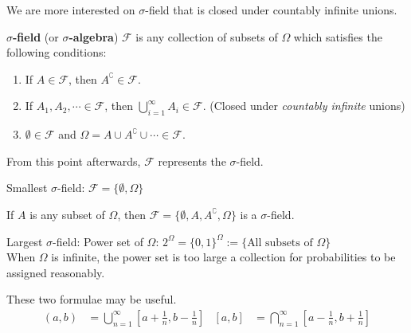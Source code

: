 \documentclass{huhtakm-template-book}
\begin{document}
    \newpage
    We are more interested on $\sigma$-field that is closed under countably infinite unions.
    \begin{defn} %
        \textbf{$\sigma$-field} (or \textbf{$\sigma$-algebra}) $\mathcal{F}$ is any collection of subsets of $\Omega$ which satisfies the following conditions:
        \begin{enumerate}
            \item If $A\in\mathcal{F}$, then $A^{\complement}\in\mathcal{F}$.
            \item If $A_{1},A_{2},\cdots\in\mathcal{F}$, then $\bigcup_{i=1}^{\infty}A_{i}\in\mathcal{F}$. (Closed under \textit{countably infinite} unions)
            \item $\emptyset\in\mathcal{F}$ and $\Omega=A\cup A^{\complement}\cup\cdots\in\mathcal{F}$.
        \end{enumerate}
    \end{defn}
    \begin{rem}
    	From this point afterwards, $\mathcal{F}$ represents the $\sigma$-field.
    \end{rem}
    \begin{eg}
        Smallest $\sigma$-field: $\mathcal{F}=\{\emptyset,\Omega\}$
    \end{eg}
    \begin{eg}
        If $A$ is any subset of $\Omega$, then $\mathcal{F}=\{\emptyset,A,A^{\complement},\Omega\}$ is a $\sigma$-field.
    \end{eg}
    \begin{eg}
        Largest $\sigma$-field: Power set of $\Omega$: $2^{\Omega}=\{0,1\}^{\Omega}:=\{\text{All subsets of }\Omega\}$\\
        When $\Omega$ is infinite, the power set is too large a collection for probabilities to be assigned reasonably.
    \end{eg}
    \begin{rem}
        These two formulae may be useful.
        \begin{align*}
            (a,b)&=\bigcup_{n=1}^{\infty}\left[a+\frac{1}{n},b-\frac{1}{n}\right] &             [a,b]&=\bigcap_{n=1}^{\infty}\left[a-\frac{1}{n},b+\frac{1}{n}\right]
        \end{align*}
    \end{rem}
    
\end{document}
